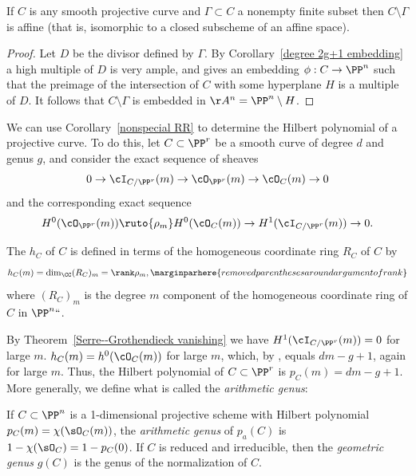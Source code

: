 \begin{corollary}
 If $C$ is any smooth projective curve and $\Gamma \subset C$ a nonempty finite subset then $C \setminus \Gamma$ is affine (that
 is, isomorphic to a closed subscheme of an affine space).
\end{corollary}

\begin{proof}
Let $D$ be the divisor defined by $\Gamma$. By Corollary~\ref{degree 2g+1 embedding} a high multiple of $D$ is very ample,
and gives an embedding $\phi: C\to \PP^n$ such that the preimage of the intersection of $C$ with some hyperplane $H$
is a multiple of $D$. It follows that $C\setminus \Gamma$ is embedded in $\AA^n = \PP^n\setminus H$.
\end{proof}
 
We can  use Corollary~\ref{nonspecial RR} to determine the Hilbert polynomial of a projective curve. To do this, let $C \subset \PP^r$ be a smooth curve of degree $d$ and genus $g$, and consider the exact sequence of sheaves
$$
0 \to \cI_{C/\PP^r}(m) \to \cO_{\PP^r}(m) \to \cO_C(m) \to 0
$$
and the corresponding exact sequence
$$
 H^0(\cO_{\PP^r}(m)) \ruto{\rho_m} H^0(\cO_C(m)) \to H^1(\cI_{C/\PP^r}(m)) \to 0.
$$

The  $h_C$ of $C$  is defined in terms of the
%
homogeneous coordinate ring $R_{C}$ of $C$ by
$$
h_C(m) = \dim_{\CC} (R_{C})_{m} = \rank \rho_m,
\marginparhere{removed parentheses around argument of rank}
$$
where $(R_{C})_{m}$ is the degree $m$ component of the homogeneous coordinate ring of $C$ in $\PP^n` `$.

By Theorem~\ref{Serre--Grothendieck vanishing} we have
$H^1(\cI_{C/\PP^r}(m)) = 0$ for large $m$.
$h_{C}(m) = h^0(\cO_C(m))$ for large $m$, which, by 
, equals $dm-g+1$, again for large $m$. 
Thus, the Hilbert polynomial of $C \subset \PP^r$ is $p_C(m) = dm-g+1$.  
More generally, we define what is called the \emph{arithmetic genus}:

\begin{definition}\label{genus Hilbert}\label{pa}\label{genus formula}
If $C\subset \PP^n$ is a 1-dimensional projective scheme with Hilbert polynomial
$p_C(m) = \chi(\sO_C(m))$, the \emph{arithmetic genus} of $p_a(C)$ is $1-\chi(\sO_{C}) = 1-p_C(0)$. If $C$ is reduced and irreducible, then
the \emph{geometric genus} $g(C)$ is the genus of the normalization of $C$.
\end{definition}

